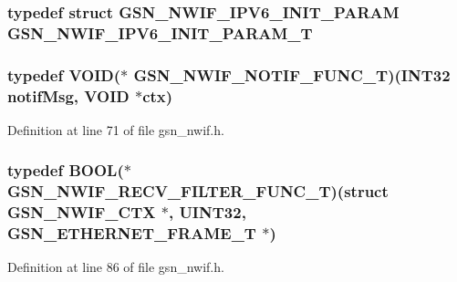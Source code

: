 \label{a00534_afc14e738a321ca724b331f740ee59e14}
\hypertarget{a00534_a231c2639d51844e6d75b4916c813f293}{
\subsubsection[{GSN\_\-NWIF\_\-IPV6\_\-INIT\_\-PARAM\_\-T}]{\setlength{\rightskip}{0pt plus 5cm}typedef struct {\bf GSN\_\-NWIF\_\-IPV6\_\-INIT\_\-PARAM} {\bf GSN\_\-NWIF\_\-IPV6\_\-INIT\_\-PARAM\_\-T}}}
\label{a00534_a231c2639d51844e6d75b4916c813f293}
\hypertarget{a00534_a58445849a3e6cfa33fbc058bafdb717c}{
\subsubsection[{GSN\_\-NWIF\_\-NOTIF\_\-FUNC\_\-T}]{\setlength{\rightskip}{0pt plus 5cm}typedef VOID($\ast$ {\bf GSN\_\-NWIF\_\-NOTIF\_\-FUNC\_\-T})({\bf INT32} notifMsg, VOID $\ast$ctx)}}
\label{a00534_a58445849a3e6cfa33fbc058bafdb717c}


Definition at line 71 of file gsn\_\-nwif.h.

\hypertarget{a00534_a2ab3fab7c51c5e11d061387dd44a2381}{
\subsubsection[{GSN\_\-NWIF\_\-RECV\_\-FILTER\_\-FUNC\_\-T}]{\setlength{\rightskip}{0pt plus 5cm}typedef {\bf BOOL}($\ast$  {\bf GSN\_\-NWIF\_\-RECV\_\-FILTER\_\-FUNC\_\-T})(struct {\bf GSN\_\-NWIF\_\-CTX} $\ast$, {\bf UINT32}, {\bf GSN\_\-ETHERNET\_\-FRAME\_\-T} $\ast$)}}
\label{a00534_a2ab3fab7c51c5e11d061387dd44a2381}


Definition at line 86 of file gsn\_\-nwif.h.

